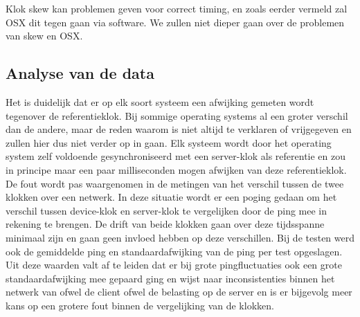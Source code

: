 Klok skew kan problemen geven voor correct timing, en zoals eerder vermeld zal OSX dit tegen gaan via software. We zullen niet dieper gaan over de problemen van skew en OSX. 


\subsection{Analyse van de data}
\label{analyse}
Het is duidelijk dat er op elk soort systeem een afwijking gemeten wordt tegenover de referentieklok. Bij sommige operating systems al een groter verschil dan de andere, maar de reden waarom is niet altijd te verklaren of vrijgegeven en zullen hier dus niet verder op in gaan. Elk systeem wordt door het operating system zelf voldoende gesynchroniseerd met een server-klok als referentie en zou in principe maar een paar milliseconden mogen afwijken van deze referentieklok. De fout wordt pas waargenomen in de metingen van het verschil tussen de twee klokken over een netwerk. In deze situatie wordt er een poging gedaan om het verschil tussen device-klok en server-klok te vergelijken door de ping mee in rekening te brengen. De drift van beide klokken gaan over deze tijdsspanne minimaal zijn en gaan geen invloed hebben op deze verschillen. Bij de testen werd ook de gemiddelde ping en standaardafwijking van de ping per test opgeslagen. Uit deze waarden valt af te leiden dat er bij grote pingfluctuaties ook een grote standaardafwijking mee gepaard ging en wijst naar inconsistenties binnen het netwerk van ofwel de client ofwel de belasting op de server en is er bijgevolg meer kans op een grotere fout binnen de vergelijking van de klokken. 

